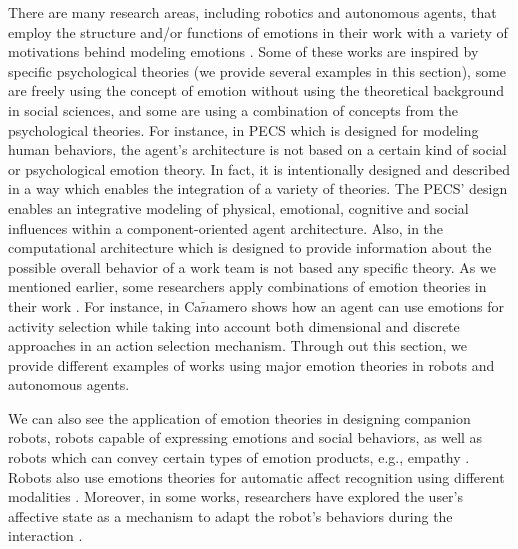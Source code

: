 \documentclass[11pt]{article}
\begin{document}
There are many research areas, including robotics and autonomous agents, that
employ the structure and/or functions of emotions in their work with a variety
of motivations behind modeling emotions
\cite{wehrle:motivations-modeling-emotion}. Some of these works are inspired by
specific psychological theories (we provide several examples in this section),
some are freely using the concept of emotion without using the theoretical
background in social sciences, and some are using a combination of concepts from
the psychological theories. For instance, in PECS \cite{urban:pecs} which is
designed for modeling human behaviors, the agent's architecture is not based on
a certain kind of social or psychological emotion theory. In fact, it is
intentionally designed and described in a way which enables the integration of a
variety of theories. The PECS' design enables an integrative modeling of
physical, emotional, cognitive and social influences within a component-oriented
agent architecture. Also, in \cite{miranda:teamwork-multiagent-system} the
computational architecture which is designed to provide information about the
possible overall behavior of a work team is not based any specific theory. As
we mentioned earlier, some researchers apply combinations of emotion theories in
their work \cite{kiryazov:modeling-appraisal-pad}. For instance, in
\cite{canamero:designing-activity-selection} Ca$\tilde{n}$amero shows how an
agent can use emotions for activity selection while taking into account both
dimensional and discrete approaches in an action selection mechanism. Through
out this section, we provide different examples of works using major emotion
theories in robots and autonomous agents.

We can also see the application of emotion theories in designing companion
robots, robots capable of expressing emotions and social behaviors, as well
as robots which can convey certain types of emotion products, e.g., empathy
\cite{breazeal:expressive-behavior} \cite{leite:empathy-hri}
\cite{paiva:emotion-modeling} \cite{shayganfar:methodology}. Robots also use
emotions theories for automatic affect recognition using different modalities
\cite{hegel:empathic-robot} \cite{zeng:affect-recognition}. Moreover, in some
works, researchers have explored the user’s affective state as a mechanism to
adapt the robot's behaviors during the interaction
\cite{breazeal:sociable-robot} \cite{liu:affect-robot-behavior}.\\
\end{document}
